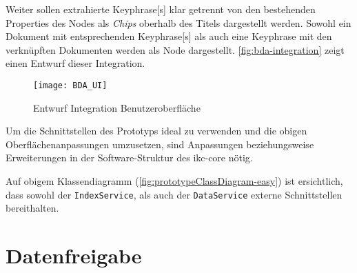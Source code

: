 Weiter sollen extrahierte \gls{Keyphrase}[s] klar getrennt von den bestehenden Properties des Nodes als \textit{Chips} oberhalb des Titels dargestellt werden. Sowohl ein Dokument mit entsprechenden \gls{Keyphrase}[s] als auch eine \gls{Keyphrase} mit den verknüpften Dokumenten werden als Node dargestellt. \autoref{fig:bda-integration} zeigt einen Entwurf dieser Integration. 

    \begin{figure}[H]
    \centering
    \texttt{[image: BDA\_UI]}
    \caption{Entwurf Integration Benutzeroberfläche}
    \label{fig:bda-integration}
    \end{figure}

Um die Schnittstellen des Prototyps ideal zu verwenden und die obigen Oberflächenanpassungen umzusetzen, sind Anpassungen beziehungsweise Erweiterungen in der Software-Struktur des \gls{ikc-core} nötig. 

Auf obigem Klassendiagramm (\autoref{fig:prototypeClassDiagram-easy}) ist ersichtlich, dass sowohl der \texttt{IndexService}, als auch der \texttt{DataService} externe Schnittstellen bereithalten.





\section{Datenfreigabe}\label{l-datenfreigabe}



